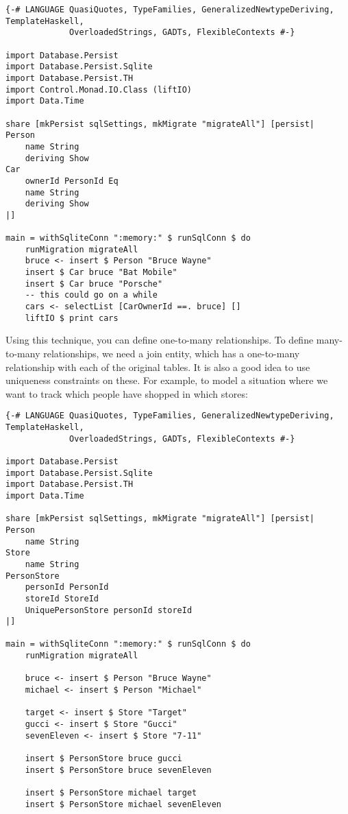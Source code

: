 \begin{lstlisting}
{-# LANGUAGE QuasiQuotes, TypeFamilies, GeneralizedNewtypeDeriving, TemplateHaskell,
             OverloadedStrings, GADTs, FlexibleContexts #-}

import Database.Persist
import Database.Persist.Sqlite
import Database.Persist.TH
import Control.Monad.IO.Class (liftIO)
import Data.Time

share [mkPersist sqlSettings, mkMigrate "migrateAll"] [persist|
Person
    name String
    deriving Show
Car
    ownerId PersonId Eq
    name String
    deriving Show
|]

main = withSqliteConn ":memory:" $ runSqlConn $ do
    runMigration migrateAll
    bruce <- insert $ Person "Bruce Wayne"
    insert $ Car bruce "Bat Mobile"
    insert $ Car bruce "Porsche"
    -- this could go on a while
    cars <- selectList [CarOwnerId ==. bruce] []
    liftIO $ print cars
\end{lstlisting}
 
Using this technique, you can define one-to-many relationships. To define many-to-many relationships, we need a join entity, which has a one-to-many relationship with each of the original tables. It is also a good idea to use uniqueness constraints on these. For example, to model a situation where we want to track which people have shopped in which stores:

\begin{lstlisting}
{-# LANGUAGE QuasiQuotes, TypeFamilies, GeneralizedNewtypeDeriving, TemplateHaskell,
             OverloadedStrings, GADTs, FlexibleContexts #-}

import Database.Persist
import Database.Persist.Sqlite
import Database.Persist.TH
import Data.Time

share [mkPersist sqlSettings, mkMigrate "migrateAll"] [persist|
Person
    name String
Store
    name String
PersonStore
    personId PersonId
    storeId StoreId
    UniquePersonStore personId storeId
|]

main = withSqliteConn ":memory:" $ runSqlConn $ do
    runMigration migrateAll

    bruce <- insert $ Person "Bruce Wayne"
    michael <- insert $ Person "Michael"

    target <- insert $ Store "Target"
    gucci <- insert $ Store "Gucci"
    sevenEleven <- insert $ Store "7-11"

    insert $ PersonStore bruce gucci
    insert $ PersonStore bruce sevenEleven

    insert $ PersonStore michael target
    insert $ PersonStore michael sevenEleven
\end{lstlisting}

